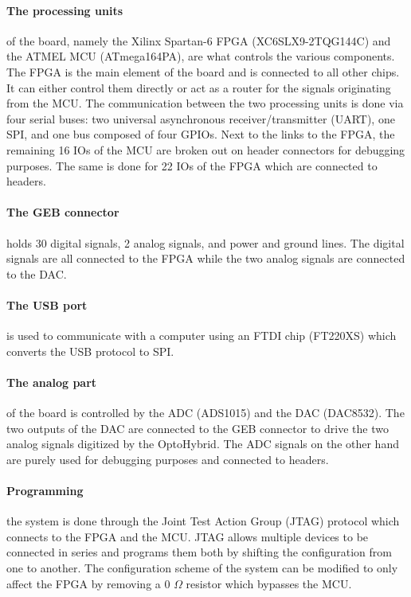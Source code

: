       \paragraph{The processing units} of the board, namely the Xilinx Spartan-6 FPGA (XC6SLX9-2TQG144C) and the ATMEL MCU (ATmega164PA), are what controls the various components. The FPGA is the main element of the board and is connected to all other chips. It can either control them directly or act as a router for the signals originating from the MCU. The communication between the two processing units is done via four serial buses: two universal asynchronous receiver/transmitter (UART), one SPI, and one bus composed of four GPIOs. Next to the links to the FPGA, the remaining 16 IOs of the MCU are broken out on header connectors for debugging purposes. The same is done for 22 IOs of the FPGA which are connected to headers.

      \paragraph{The GEB connector} holds 30 digital signals, 2 analog signals, and power and ground lines. The digital signals are all connected to the FPGA while the two analog signals are connected to the DAC.

      \paragraph{The USB port} is used to communicate with a computer using an FTDI chip (FT220XS) which converts the USB protocol to SPI.

      \paragraph{The analog part} of the board is controlled by the ADC (ADS1015) and the DAC (DAC8532). The two outputs of the DAC are connected to the GEB connector to drive the two analog signals digitized by the OptoHybrid. The ADC signals on the other hand are purely used for debugging purposes and connected to headers.

      \paragraph{Programming} the system is done through the Joint Test Action Group (JTAG) protocol which connects to the FPGA and the MCU. JTAG allows multiple devices to be connected in series and programs them both by shifting the configuration from one to another. The configuration scheme of the system can be modified to only affect the FPGA by removing a 0 $\Omega$ resistor which bypasses the MCU.

